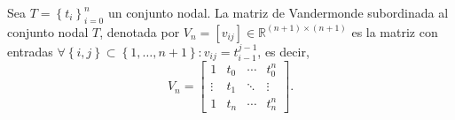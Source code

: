 \begin{frame}
	\begin{definition}
		Sea
		\begin{math}
			T=
			{
			\left\{
			t_{i}
			\right\}
			}^{n}_{i=0}
		\end{math}
		un conjunto nodal.
		La \alert{matriz de Vandermonde} subordinada al conjunto
		nodal $T$, denotada por
		\begin{math}
			V_{n}=
			\left[v_{ij}\right]\in
			\mathbb{R}^{\left(n+1\right)\times\left(n+1\right)}
		\end{math}
		es la matriz con entradas
		\begin{math}
			\forall\left\{i,j\right\}\subset
			\left\{1,\dotsc,n+1\right\}:
			v_{ij}=
			t^{j-1}_{i-1}
		\end{math},
		es decir,
		\begin{equation*}
			V_{n}=
			\begin{bmatrix}
				1      & t_{0} & \cdots & t_{0}^{n} \\
				\vdots & t_{1} & \ddots & \vdots    \\
				1      & t_{n} & \cdots & t_{n}^{n}
			\end{bmatrix}.
		\end{equation*}
	\end{definition}
\end{frame}

